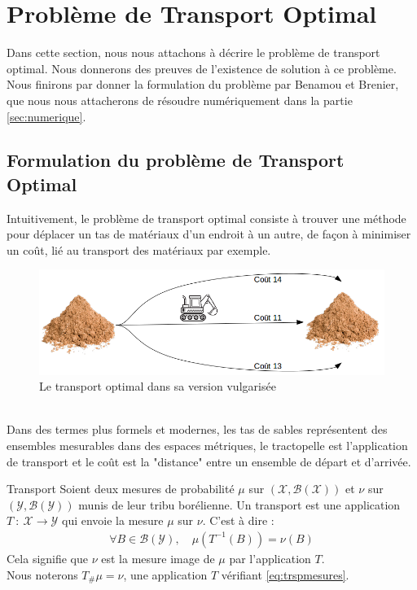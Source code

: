 \documentclass[a4paper,12pt]{article}
\begin{document}
\section{Problème de Transport Optimal}
Dans cette section, nous nous attachons à décrire le problème de transport optimal. Nous donnerons des preuves de l'existence de solution à ce problème. Nous finirons par donner la formulation du problème par Benamou et Brenier, que nous nous attacherons de résoudre numériquement dans la partie \ref{sec:numerique}. 

\subsection{Formulation du problème de Transport Optimal}
Intuitivement, le problème de transport optimal consiste à trouver une méthode pour déplacer un tas de matériaux d'un endroit à un autre, de façon à minimiser un coût, lié au transport des matériaux par exemple. 
\begin{figure}[!h]
\centering
\includegraphics[width=\linewidth]{img/tractopelle.png}
\caption{\label{fig:tractopelle}Le transport optimal dans sa version vulgarisée}
\end{figure}\\
Dans des termes plus formels et modernes, les tas de sables représentent des ensembles mesurables dans des espaces métriques, le tractopelle est l'application de transport et le coût est la "distance" entre un ensemble de départ et d'arrivée. 
\begin{definition}{Transport}
Soient deux mesures de probabilité $\mu$ sur $(\mathcal{X},\mathcal{B}(\mathcal{X}))$ et $\nu$ sur $(\mathcal{Y},\mathcal{B}(\mathcal{Y}))$ munis de leur tribu borélienne. Un transport est une application $T\ :\ \mathcal{X}\rightarrow\mathcal{Y}$ qui envoie la mesure $\mu$ sur $\nu$. C'est à dire : 
\begin{align}
\forall B\in\mathcal{B}(\mathcal{Y}),\quad \mu(T^{-1}(B))=\nu(B)
\label{eq:trspmesures}
\end{align}
Cela signifie que $\nu$ est la mesure image de $\mu$ par l'application $T$.\\
Nous noterons $T_{\#}\mu=\nu$, une application $T$ vérifiant \eqref{eq:trspmesures}.
\end{definition}
\end{document}
